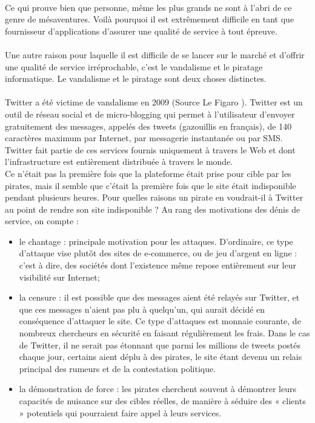 \documentclass[a4paper,12pt]{report}
\begin{document}
\begin{onehalfspace}
	\paragraph*{}
	Ce qui prouve bien que personne, même les plus grands ne sont à l'abri de ce genre de mésaventures. Voilà pourquoi il est extrêmement difficile en tant que fournisseur d'applications d'assurer une qualité de service à tout épreuve.

	\paragraph*{}
	Une autre raison pour laquelle il est difficile de se lancer sur le marché et d'offrir une
qualité de service irréprochable, c'est le vandalisme et le piratage informatique. Le vandalisme et le piratage sont deux choses distinctes. 

	\paragraph*{}
	Twitter a été victime de vandalisme en 2009 (Source Le Figaro \cite{source:twitter}). Twitter est un outil de réseau social et de micro-blogging qui permet à l'utilisateur d'envoyer gratuitement des messages, appelés des tweets (gazouillis en français), de 140 caractères maximum par Internet, par messagerie instantanée ou par SMS. Twitter fait partie de ces services fournis uniquement à travers le
Web et dont l'infrastructure est entièrement distribuée à travers le monde.\\

Ce n'était pas la première fois que la plateforme était prise pour cible par les pirates, mais il semble que c'était la première fois que le site était indisponible pendant plusieurs heures. Pour quelles raisons un pirate en voudrait-il à Twitter au point de rendre son site
indisponible ? Au rang des motivations des dénis de service, on compte :

	\begin{itemize}
		\item le chantage : principale motivation pour les attaques. D'ordinaire, ce type d'attaque vise plutôt des sites de e-commerce, ou de jeu d'argent en ligne : c'est à dire, des sociétés dont l'existence même repose entièrement sur leur visibilité sur Internet;
		\item la censure : il est possible que des messages aient été relayés sur Twitter, et que ces
messages n'aient pas plu à quelqu'un, qui aurait décidé en conséquence d'attaquer le site. Ce type d'attaques est monnaie courante, de nombreux chercheurs en sécurité en faisant régulièrement les frais. Dans le cas de Twitter, il ne serait pas étonnant que parmi les millions de tweets postés chaque jour, certains aient déplu à des pirates, le site étant devenu un relais principal des rumeurs et de la contestation politique.
		\item la démonstration de force : les pirates cherchent souvent à démontrer leurs capacités
de nuisance sur des cibles réelles, de manière à séduire des « clients » potentiels qui pourraient faire appel à leurs services.
	\end{itemize}


\end{onehalfspace}
\end{document}
